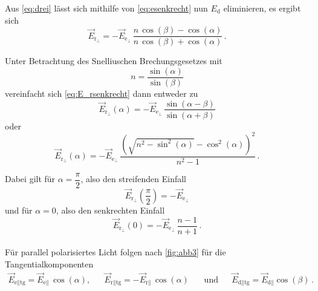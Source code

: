 Aus \eqref{eq:drei} lässt sich mithilfe von \eqref{eq:esenkrecht} nun $E_{\text{d}}$ eliminieren, es ergibt sich
\begin{equation}
    \vec{E}_{\text{r}_{\perp}} = - \vec{E}_{\text{e}_{\perp}} \, \frac{n \, \cos(\beta) - \cos(\alpha)}{n \, \cos(\beta) + \cos(\alpha)} \,.
    \label{eq:E_rsenkrecht}
\end{equation}

Unter Betrachtung des Snelliuschen Brechungsgesetzes mit
\begin{equation}
    n = \frac{\sin(\alpha)}{\sin(\beta)}
    \label{eq:snellius}
\end{equation}
vereinfacht sich \eqref{eq:E_rsenkrecht} dann entweder zu
\begin{equation}
    \vec{E}_{\text{r}_{\perp}}(\alpha) = - \vec{E}_{\text{e}_{\perp}} \, \frac{\sin(\alpha - \beta)}{\sin(\alpha + \beta)}
\end{equation}
oder
\begin{equation}
    \vec{E}_{\text{r}_{\perp}}(\alpha) = - \vec{E}_{\text{e}_{\perp}} \, \frac{\left( \sqrt{n^2 - \sin^2(\alpha)} - \cos^2(\alpha) \right)^2}{n^2 - 1} \,.
    \label{eq:E_rsenkrecht+snell}
\end{equation}

Dabei gilt für $\alpha = \dfrac{\pi}{2}$, also den streifenden Einfall
\begin{equation*}
    \vec{E}_{\text{r}_{\perp}} \left(\frac{\pi}{2} \right) = - \vec{E}_{\text{e}_{\perp}}
\end{equation*}
und für $\alpha = 0$, also den senkrechten Einfall
\begin{equation*}
    \vec{E}_{\text{r}_{\perp}}(0) = - \vec{E}_{\text{e}_{\perp}} \, \frac{n - 1}{n + 1} \,.
\end{equation*} \\

Für parallel polarisiertes Licht folgen nach \autoref{fig:abb3} für die Tangentialkomponenten
\begin{align*}
    \vec{E}_{\text{e}\parallel \text{tg}} = \vec{E}_{\text{e}\parallel} \, \cos(\alpha), && \vec{E}_{\text{r}\parallel \text{tg}} = - \vec{E}_{\text{r}\parallel} \, \cos(\alpha) \, &&
    \text{und} && \vec{E}_{\text{d}\parallel \text{tg}} = \vec{E}_{\text{d}\parallel} \cos(\beta) \,.
\end{align*}


